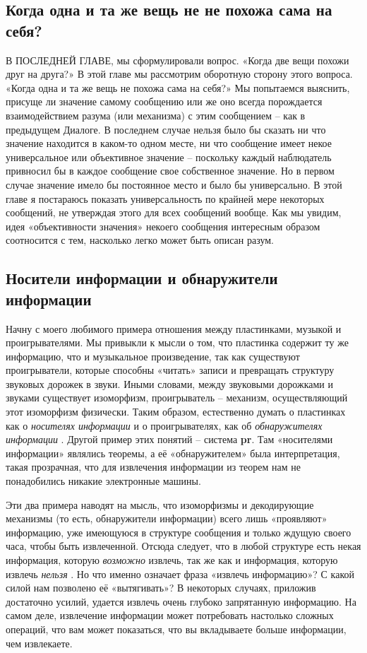 \documentclass[../main.tex]{subfiles}
\begin{document}

\subsection{Когда одна и та же вещь не не похожа сама на себя?}

В ПОСЛЕДНЕЙ ГЛАВЕ, мы сформулировали вопрос. «Когда две вещи похожи друг на друга?» В этой главе мы рассмотрим оборотную сторону этого вопроса. «Когда одна и та же вещь не похожа сама на себя?» Мы попытаемся выяснить, присуще ли значение самому сообщению или же оно всегда порождается взаимодействием разума (или механизма) с этим сообщением \--- как в предыдущем Диалоге. В последнем случае нельзя было бы сказать ни что значение находится в каком-то одном месте, ни что сообщение имеет некое универсальное или объективное значение \--- поскольку каждый наблюдатель привносил бы в каждое сообщение свое собственное значение. Но в первом случае значение имело бы постоянное место и было бы универсально. В этой главе я постараюсь показать универсальность по крайней мере некоторых сообщений, не утверждая этого для всех сообщений вообще. Как мы увидим, идея «объективности значения» некоего сообщения интересным образом соотносится с тем, насколько легко может быть описан разум.


\subsection{Носители информации и обнаружители информации}

Начну с моего любимого примера отношения между пластинками, музыкой и проигрывателями. Мы привыкли к мысли о том, что пластинка содержит ту же информацию, что и музыкальное произведение, так как существуют проигрыватели, которые способны «читать» записи и превращать структуру звуковых дорожек в звуки. Иными словами, между звуковыми дорожками и звуками существует изоморфизм, проигрыватель \--- механизм, осуществляющий этот изоморфизм физически. Таким образом, естественно думать о пластинках как о \emph{носителях информации} и о проигрывателях, как об \emph{обнаружителях информации} . Другой пример этих понятий \--- система \textbf{pr}. Там «носителями информации» являлись теоремы, а её «обнаружителем» была интерпретация, такая прозрачная, что для извлечения информации из теорем нам не понадобились никакие электронные машины.

Эти два примера наводят на мысль, что изоморфизмы и декодирующие механизмы (то есть, обнаружители информации) всего лишь «проявляют» информацию, уже имеющуюся в структуре сообщения и только ждущую своего часа, чтобы быть извлеченной. Отсюда следует, что в любой структуре есть некая информация, которую \emph{возможно} извлечь, так же как и информация, которую извлечь \emph{нельзя} . Но что именно означает фраза «извлечь информацию»? С какой силой нам позволено её «вытягивать»? В некоторых случаях, приложив достаточно усилий, удается извлечь очень глубоко запрятанную информацию. На самом деле, извлечение информации может потребовать настолько сложных операций, что вам может показаться, что вы вкладываете больше информации, чем извлекаете.
\end{document}
